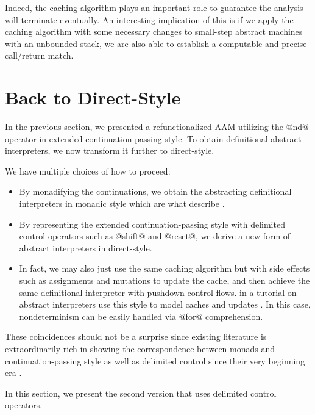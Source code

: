 \documentclass[acmsmall, review]{acmart}\settopmatter{}
\begin{document}
Indeed, the caching algorithm plays an important role to guarantee the analysis will
terminate eventually.
An interesting implication of this is if we apply the caching algorithm with some 
necessary changes to small-step abstract machines with an unbounded stack, we are 
also able to establish a computable and precise call/return match.

\section{Back to Direct-Style} \label{directstyle}

In the previous section, we presented a refunctionalized AAM utilizing the @nd@ operator
in extended continuation-passing style.
To obtain definitional abstract interpreters, we now transform it further to direct-style.

We have multiple choices of how to proceed:
\begin{itemize}
  \item By monadifying the continuations, we obtain the abstracting
    definitional interpreters in monadic style which are what \citeauthor{darais2017abstracting}
    describe \cite{darais2017abstracting}.
  \item By representing the extended continuation-passing style with delimited control operators
    such as @shift@ and @reset@, we derive a new form of abstract interpreters in direct-style.
  \item In fact, we may also just use the same caching algorithm but with side effects such as
    assignments and mutations to update the cache, and then achieve the same definitional 
    interpreter with pushdown control-flows. \citeauthor{friedman-ai} in a tutorial on abstract 
    interpreters use this style to model caches and updates \cite{friedman-ai}.
    In this case, nondeterminism can be easily handled via @for@ comprehension. 
\end{itemize}

These coincidences should not be a surprise since existing literature is extraordinarily rich
in showing the correspondence between monads and continuation-passing style as well as
delimited control since their very beginning era \cite{Danvy:1990:AC:91556.91622, wadler1992essence,
danvy1992representing, moggi1991notions}.

In this section, we present the second version that uses delimited control operators.
\end{document}

